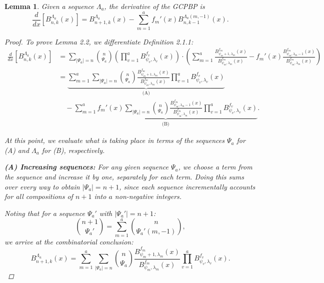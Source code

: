 \documentclass[11pt]{article}
\theoremstyle{plain}
\newtheorem{lemma}[theorem]{Lemma}      %
\theoremstyle{definition}
\begin{document}
\begin{lemma}
Given a sequence $\Lambda_a$, the derivative of the GCPBP is
\begin{equation*}
    \frac{d}{dx}\left[B_{n,k}^{\Lambda_a}(x)\right] = B_{n+1,k}^{\Lambda_a}(x) - \sum_{m=1}^a f_m'(x) B_{n,k-1}^{\Lambda_a(m,-1)}(x).
\end{equation*}
\begin{proof}
To prove Lemma 2.2, we differentiate Definition 2.1.1:
\begin{align*}
\frac{d}{dx}\left[B_{n,k}^{\Lambda_a}(x)\right] 
&= \sum_{|\Psi_a|=n} \binom{n}{\Psi_a} \left(\prod_{v=1}^a B_{\psi_v,\lambda_v}^{f_v}(x)\right) \cdot 
\left(\sum_{m=1}^a \frac{B_{\psi_m+1,\lambda_m}^{f_m}(x)}{B_{\psi_m,\lambda_m}^{f_m}(x)} - f_m'(x) \frac{B_{\psi_m,\lambda_m-1}^{f_m}(x)}{B_{\psi_m,\lambda_m}^{f_m}(x)} \right) \\
&= \underbrace{\sum_{m=1}^a \sum_{|\Psi_a|=n} \binom{n}{\Psi_a} \frac{B_{\psi_m+1,\lambda_m}^{f_m}(x)}{B_{\psi_m,\lambda_m}^{f_m}(x)} \prod_{v=1}^{a}B_{\psi_v,\lambda_v}^{f_v}(x)}_{\text{(A)}} \\
&\quad - \underbrace{\sum_{m=1}^a f_m'(x)\sum_{|\Psi_a|=n} \binom{n}{\Psi_a}\frac{B_{\psi_m,\lambda_m-1}^{f_m}(x)}{B_{\psi_m,\lambda_m}^{f_m}(x)} \prod_{v=1}^a B_{\psi_v,\lambda_v}^{f_v}(x)}_{\text{(B)}}.
\end{align*}

At this point, we evaluate what is taking place in terms of the sequences $\Psi_a$ for (A) and $\Lambda_a$ for (B), respectively.

\textbf{(A) Increasing sequences:}  
For any given sequence $\Psi_a$, we choose a term from the sequence and increase it by one, separately for each term. Doing this sums over every way to obtain $|\Psi_a| = n+1$, since each sequence incrementally accounts for all compositions of $n+1$ into $a$ non-negative integers.  

Noting that for a sequence $\Psi_a'$ with $|\Psi_a'| = n+1$:
\begin{equation*}
    \binom{n+1}{\Psi_a'} = \sum_{m=1}^a \binom{n}{\Psi_a'(m,-1)},
\end{equation*}
we arrive at the combinatorial conclusion:
\begin{equation*}
    B_{n+1,k}^{\Lambda_a}(x) = \sum_{m=1}^a \sum_{|\Psi_a|=n}\binom{n}{\Psi_a} \frac{B_{\psi_m+1,\lambda_m}^{f_m}(x)}{B_{\psi_m,\lambda_m}^{f_m}(x)} \prod_{v=1}^a B_{\psi_v,\lambda_v}^{f_v}(x).
\end{equation*}


\end{proof}
\end{lemma}
\end{document}
